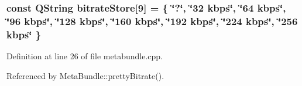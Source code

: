 \subsubsection{\setlength{\rightskip}{0pt plus 5cm}const QString {\bf bitrate\-Store}[9] = \{ \char`\"{}?\char`\"{}, \char`\"{}32 kbps\char`\"{}, \char`\"{}64 kbps\char`\"{}, \char`\"{}96 kbps\char`\"{}, \char`\"{}128 kbps\char`\"{}, \char`\"{}160 kbps\char`\"{}, \char`\"{}192 kbps\char`\"{}, \char`\"{}224 kbps\char`\"{}, \char`\"{}256 kbps\char`\"{} \}\hspace{0.3cm}{\tt  [static]}}\label{metabundle_8cpp_a0}




Definition at line 26 of file metabundle.cpp.

Referenced by Meta\-Bundle::pretty\-Bitrate().